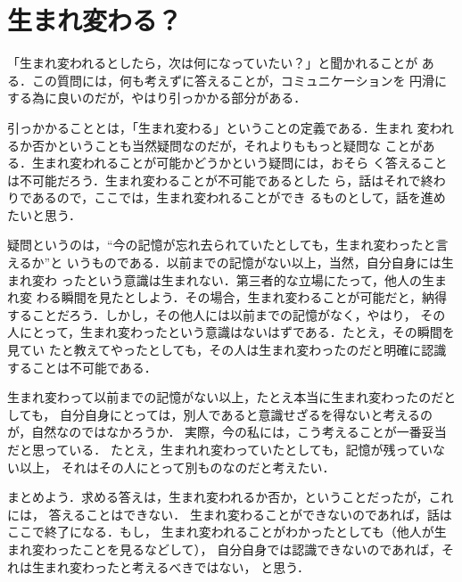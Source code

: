 ﻿%

        \section{生まれ変わる？}
            「生まれ変われるとしたら，次は何になっていたい？」と聞かれることが
            ある．この質問には，何も考えずに答えることが，コミュニケーションを
            円滑にする為に良いのだが，やはり引っかかる部分がある．

            引っかかることとは，「生まれ変わる」ということの定義である．生まれ
            変われるか否かということも当然疑問なのだが，それよりももっと疑問な
            ことがある．生まれ変われることが可能かどうかという疑問には，おそら
            く答えることは不可能だろう．生まれ変わることが不可能であるとした
            ら，話はそれで終わりであるので，ここでは，生まれ変われることができ
            るものとして，話を進めたいと思う．

            疑問というのは，“今の記憶が忘れ去られていたとしても，生まれ変わったと言えるか”と
            いうものである．以前までの記憶がない以上，当然，自分自身には生まれ変わ
            ったという意識は生まれない．第三者的な立場にたって，他人の生まれ変
            わる瞬間を見たとしよう．その場合，生まれ変わることが可能だと，納得
            することだろう．しかし，その他人には以前までの記憶がなく，やはり，
            その人にとって，生まれ変わったという意識はないはずである．たとえ，その瞬間を見てい
            たと教えてやったとしても，その人は生まれ変わったのだと明確に認識することは不可能である．

            生まれ変わって以前までの記憶がない以上，たとえ本当に生まれ変わったのだとしても，
            自分自身にとっては，別人であると意識せざるを得ないと考えるのが，自然なのではなかろうか．
            実際，今の私には，こう考えることが一番妥当だと思っている．
            たとえ，生まれれ変わっていたとしても，記憶が残っていない以上，
            それはその人にとって別ものなのだと考えたい．

            まとめよう．求める答えは，生まれ変われるか否か，ということだったが，これには，
            答えることはできない．
            生まれ変わることができないのであれば，話はここで終了になる．もし，
            生まれ変われることがわかったとしても（他人が生まれ変わったことを見るなどして），
            自分自身では認識できないのであれば，それは生まれ変わったと考えるべきではない，
            と思う．

